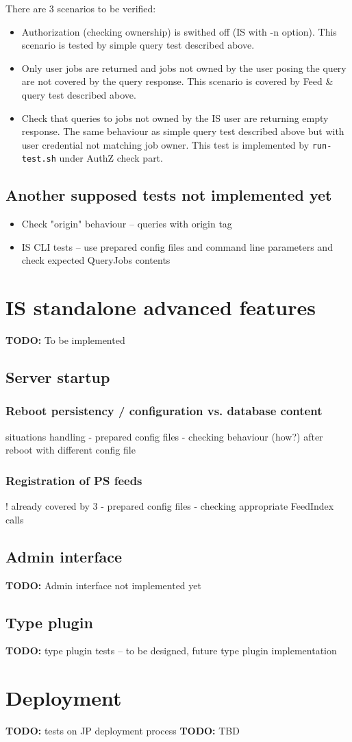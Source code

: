 \documentclass{egee}
\def\todo#1{\textbf{TODO:} #1}
\begin{document}
There are 3 scenarios to be verified:
\begin{itemize}
 \item Authorization (checking ownership) is swithed off (IS with -n
   option). This scenario is tested by simple query test described above.
 \item Only user jobs are returned and jobs not owned by the user posing
   the query are not covered by the query response. This scenario is
   covered by Feed \& query test described above.
 \item Check that queries to jobs not owned by the IS user are
   returning empty response. The same behaviour as simple query test
   described above but with user credential not matching job
   owner. This test is implemented by \texttt{run-test.sh} under AuthZ
   check part.
\end{itemize}

\subsection{Another supposed tests not implemented yet}

\begin{itemize}
 \item Check "origin" behaviour -- queries with origin tag
 \item IS CLI tests -- use prepared config files and command line parameters
  and check expected QueryJobs contents
\end{itemize}


\section{IS standalone advanced features}
\todo{To be implemented}

\subsection{Server startup}

\subsubsection{Reboot persistency / configuration vs. database content}
    situations handling
- prepared config files
- checking behaviour (how?) after reboot with different config file

\subsubsection{Registration of PS feeds}
! already covered by 3
- prepared config files
- checking appropriate FeedIndex calls

\subsection{Admin interface}
\todo{Admin interface not implemented yet}

\subsection{Type plugin}
\todo{type plugin tests -- to be designed, future type plugin implementation}

\section{Deployment}
\todo{tests on JP deployment process}
\todo{TBD}
\end{document}
